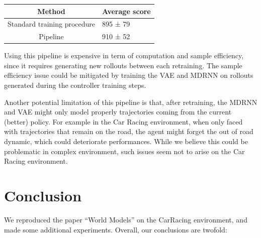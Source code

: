 \documentclass[10pt,a4paper,onecolumn]{article}
\begin{document}
\begin{longtable}[]{@{}cl@{}}
\toprule
Method & Average score\tabularnewline
\midrule
\endhead
Standard training procedure & 895 ± 79\tabularnewline
Pipeline & 910 ± 52\tabularnewline
\bottomrule
\end{longtable}

Using this pipeline is expensive in term of computation and sample
efficiency, since it requires generating new rollouts between each
retraining. The sample efficiency issue could be mitigated by training
the VAE and MDRNN on rollouts generated during the controller training
steps.

Another potential limitation of this pipeline is that, after retraining,
the MDRNN and VAE might only model properly trajectories coming from the
current (better) policy. For example in the Car Racing environment, when
only faced with trajectories that remain on the road, the agent might
forget the out of road dynamic, which could deteriorate performances.
While we believe this could be problematic in complex environment, such
issues seem not to arise on the Car Racing environment.

\hypertarget{conclusion}{%
\section{Conclusion}\label{conclusion}}

We reproduced the paper ``World Models'' on the CarRacing environment,
and made some additional experiments. Overall, our conclusions are
twofold:
\end{document}
